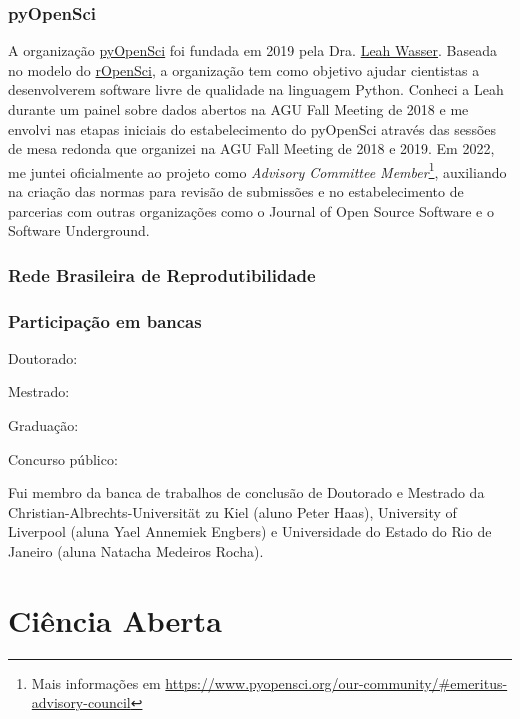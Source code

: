 \documentclass[12pt,a4paper,oneside]{book}
\newcommand{\UoL}{University of Liverpool}
\newcommand{\UERJ}{Universidade do Estado do Rio de Janeiro}
\begin{document}
\subsection{pyOpenSci}

A organização \href{https://www.pyopensci.org/}{pyOpenSci} foi fundada em
2019 pela Dra. \href{https://www.leahwasser.com}{Leah Wasser}.
Baseada no modelo do \href{https://ropensci.org/}{rOpenSci}, a organização tem
como objetivo ajudar cientistas a desenvolverem software livre de qualidade na
linguagem Python.
Conheci a Leah durante um painel sobre dados abertos na AGU Fall Meeting de
2018 e me envolvi nas etapas iniciais do estabelecimento do pyOpenSci através
das sessões de mesa redonda que organizei na AGU Fall Meeting de 2018 e 2019.
Em 2022, me juntei oficialmente ao projeto como
\textit{Advisory Committee Member}\footnote{Mais informações em
\url{https://www.pyopensci.org/our-community/\#emeritus-advisory-council}},
auxiliando na criação das normas para revisão de submissões e no estabelecimento
de parcerias com outras organizações como o Journal of Open Source Software e
o Software Underground.


\subsection{Rede Brasileira de Reprodutibilidade}


\subsection{Participação em bancas}

Doutorado:

Mestrado:

Graduação:

Concurso público:

Fui membro da banca de trabalhos de conclusão de Doutorado e Mestrado da
Christian-Albrechts-Universität zu Kiel (aluno Peter Haas),
\UoL{} (aluna Yael Annemiek Engbers)
e \UERJ{} (aluna Natacha Medeiros Rocha).


\chapter{Ciência Aberta}
\label{cap_cienciaaberta}
\end{document}
